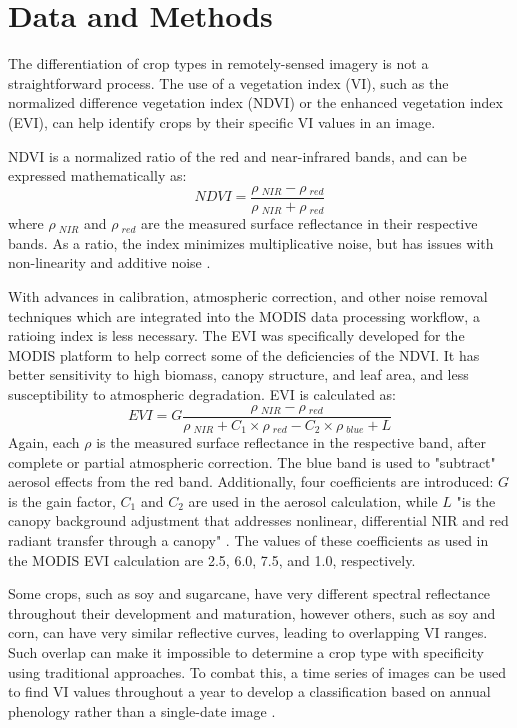 \newpage %
\section*{Data and Methods}

The differentiation of crop types in remotely-sensed imagery is not a straightforward process. The use of a vegetation index (VI), such as the normalized difference vegetation index (NDVI) or the enhanced vegetation index (EVI), can help identify crops by their specific VI values in an image.

NDVI is a normalized ratio of the red and near-infrared bands, and can be expressed mathematically as:
\begin{equation}
  NDVI = \frac{\rho~_{NIR} - \rho~_{red}}{\rho~_{NIR} + \rho~_{red}}
\end{equation}
where $\rho~_{NIR}$ and $\rho~_{red}$ are the measured surface reflectance in their respective bands. As a ratio, the index minimizes multiplicative noise, but has issues with non-linearity and additive noise \autocite{huete2002overview}.

With advances in calibration, atmospheric correction, and other noise removal techniques which are integrated into the MODIS data processing workflow, a ratioing index is less necessary. The EVI was specifically developed for the MODIS platform to help correct some of the deficiencies of the NDVI. It has better sensitivity to high biomass, canopy structure, and leaf area, and less susceptibility to atmospheric degradation. EVI is calculated as:
\begin{equation}
  EVI = G\frac{\rho~_{NIR} - \rho~_{red}}{\rho~_{NIR} +  C_1\times\rho~_{red} - C_2 \times \rho~_{blue} + L}
\end{equation}
Again, each $\rho$ is the measured surface reflectance in the respective band, after complete or partial atmospheric correction. The blue band is used to "subtract" aerosol effects from the red band. Additionally, four coefficients are introduced: $G$ is the gain factor, $C_1$ and $C_2$ are used in the aerosol calculation, while $L$ "is the canopy background adjustment that addresses nonlinear, differential NIR and red radiant transfer through a canopy" \citereset\autocite[196]{huete2002overview}. The values of these coefficients as used in the MODIS EVI calculation are 2.5, 6.0, 7.5, and 1.0, respectively.

Some crops, such as soy and sugarcane, have very different spectral reflectance throughout their development and maturation, however others, such as soy and corn, can have very similar reflective curves, leading to overlapping VI ranges. Such overlap can make it impossible to determine a crop type with specificity using traditional approaches. To combat this, a time series of images can be used to find VI values throughout a year to develop a classification based on annual phenology rather than a single-date image \autocites{gu2010phenological}{wardlow2002discriminating}{wardlow2005state-level}{wardlow2007analysis}{wardlow2008large-area}{zhang2003monitoring}.
	

